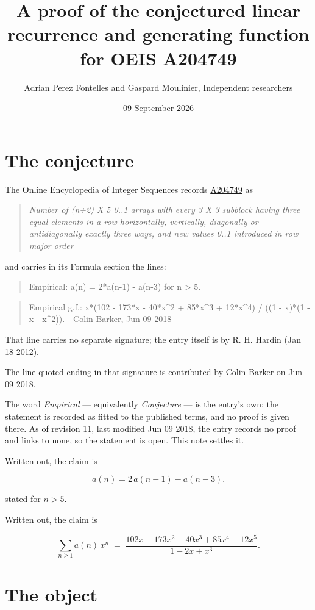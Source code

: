\documentclass[11pt]{article}
\title{A proof of the conjectured linear recurrence and generating function for OEIS A204749}
\author{Adrian Perez Fontelles and Gaspard Moulinier, Independent researchers}
\date{09 September 2026}
\theoremstyle{definition}
\begin{document}
\maketitle
\section{The conjecture}

The Online Encyclopedia of Integer Sequences records \href{https://oeis.org/A204749}{A204749} as

\begin{quote}\itshape Number of (n+2) X 5 0..1 arrays with every 3 X 3 subblock having three equal elements in a row horizontally, vertically, diagonally or antidiagonally exactly three ways, and new values 0..1 introduced in row major order\end{quote}

and carries in its Formula section the lines:

\begin{quote}\ttfamily Empirical: a(n) = 2*a(n-1) - a(n-3) for n > 5.\end{quote}

\begin{quote}\ttfamily Empirical g.f.: x*(102 - 173*x - 40*x\textasciicircum{}2 + 85*x\textasciicircum{}3 + 12*x\textasciicircum{}4) / ((1 - x)*(1 - x - x\textasciicircum{}2)). - Colin Barker, Jun 09 2018\end{quote}

That line carries no separate signature; the entry itself is by R. H. Hardin (Jan 18 2012).

The line quoted ending in that signature is contributed by Colin Barker on Jun 09 2018.

The word {\itshape Empirical} --- equivalently {\itshape Conjecture} --- is the entry's own: the statement is recorded as fitted to the published terms, and no proof is given there. As of revision 11, last modified Jun 09 2018, the entry records no proof and links to none, so the statement is open. This note settles it.

Written out, the claim is

\[a(n) = 2\,a(n-1) - a(n-3).\]

stated for $n > 5$.

Written out, the claim is

\[\sum_{n \ge 1} a(n)\,x^n \;=\; \frac{102x - 173x^{2} - 40x^{3} + 85x^{4} + 12x^{5}}{1 - 2x + x^{3}}.\]

\section{The object}
\end{document}

